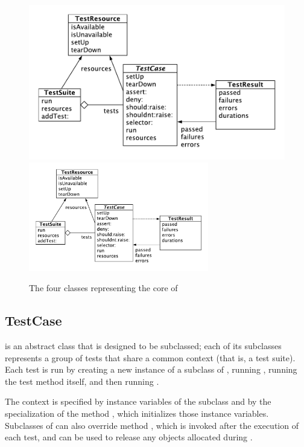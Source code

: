 \documentclass[a4paper,10pt,twoside]{book}
\begin{document}
\begin{figure}[htb]
  \begin{center}
  	\ifluluelse
		{\includegraphics[width=\textwidth]{sunit-classes}}
		{\includegraphics[width=0.7\textwidth]{sunit-classes}}
	\caption{The four classes representing the core of \SUnit}
	\label{fig:sunit-classes}
  \end{center}
\end{figure}


\subsection{TestCase}

 is an abstract class that is designed to be subclassed; each of its subclasses represents a group of tests that share a common context (that is, a test suite).
Each test is run by creating a new instance of a subclass of , running , running the test method itself, and then running .

The context is specified by instance variables of the subclass and by the specialization of the method , which initializes those instance variables.
Subclasses of  can also override method , which is invoked after the execution of each test, and can be used to release any objects allocated during .
\end{document}

